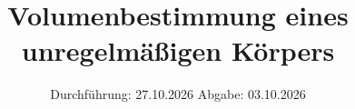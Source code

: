 


\subject{V100}
\title{Volumenbestimmung eines unregelmäßigen Körpers}
\date{%
  Durchführung: 27.10.2026
  \hspace{3em}
  Abgabe: 03.10.2026
}



\maketitle
\thispagestyle{empty}
\tableofcontents
\newpage


% 



\printbibliography{}

% 


